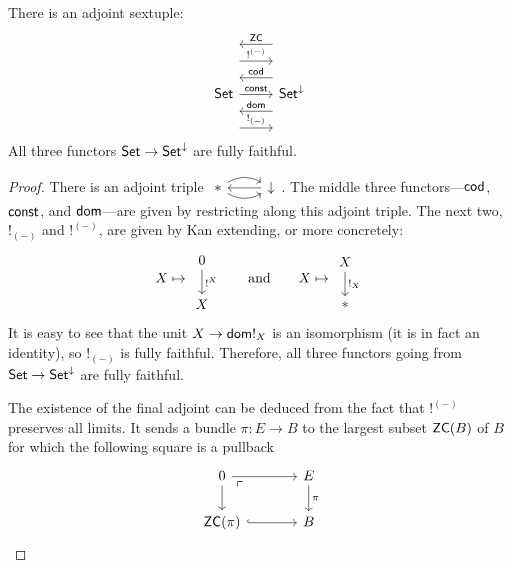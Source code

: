 \begin{prop}\label{prop:adjoint.sextuple}
  There is an adjoint sextuple:
  \[
    \begin{tikzcd}
      \Set \arrow[r, "\const"] \arrow[r, leftarrow, shift left = 5,
      "\term{cod}"] \arrow[r, leftarrow, shift right = 5, "\term{dom}"]
      \arrow[r, shift left = 10, "!^{(-)}"]  \arrow[r, shift right = 10,
      "!_{(-)}"] \arrow[r, leftarrow, shift left = 15, "\term{ZC}"]& \Set^{\down}
    \end{tikzcd}
  \]
  All three functors $\operatorname{\mathsf{{Set}}} \to \operatorname{\mathsf{{Set}}}^{\mathbin{\downarrow}}$ are fully faithful.
\end{prop}
\begin{proof}
There is an adjoint triple $\begin{tikzcd} \ast \arrow[r,leftarrow] \arrow[r,
  bend left] \arrow[r, bend right] & \down \end{tikzcd}$. The middle three
functors---$\mathsf{{cod}}$, $\mathsf{{const}}$, and $\mathsf{{dom}}$---are given by restricting along this adjoint triple. The next two, $!_{(-)}$ and $!^{(-)}$, are
given by Kan extending, or more concretely:
  \begin{equation}\label{eqn.bangbang}
  X \mapsto \begin{tikzcd} 0 \arrow[d, "!^X"] \\ X \end{tikzcd}
  \qquad\text{and}\qquad
  X \mapsto \begin{tikzcd} X \arrow[d, "!_X"] \\ \ast \end{tikzcd}
  \end{equation}
 It is easy to see that the unit $X \to \mathsf{{dom}} !_{X}$ is an isomorphism (it is in
fact an identity), so $!_{(-)}$ is fully faithful. Therefore, all three functors
going from $\operatorname{\mathsf{{Set}}} \to \operatorname{\mathsf{{Set}}}^{\mathbin{\downarrow}}$ are fully faithful.

The existence of the final adjoint can be deduced from the fact that $!^{(-)}$ preserves all
limits. It sends a bundle $\pi : E \to B$ to the largest subset $\mathsf{{ZC}}(B)$ of $B$ for
which the following square is a pullback
\[
  \begin{tikzcd}[column sep=large]
0 \arrow[r] \arrow[d] \arrow[dr, phantom,
"\ulcorner" very near start] & E \arrow[d, "\pi"] \\
\term{ZC}(\pi) \arrow[r, hookrightarrow]                                       & B
\end{tikzcd}
\]
\end{proof}
